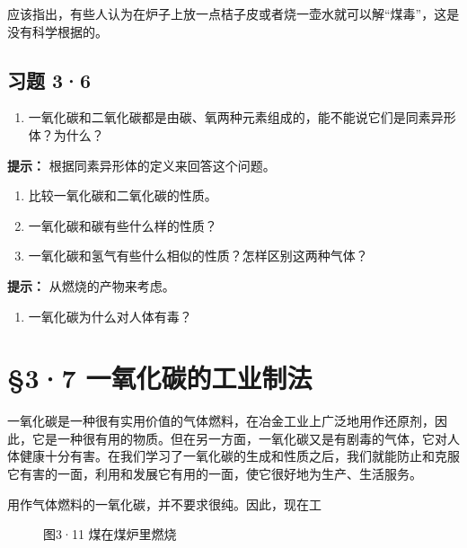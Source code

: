 应该指出，有些人认为在炉子上放一点桔子皮或者烧一壶水就可以解``煤毒''，这是没有科学根据的。

\subsection{习题 3·6}

\begin{enumerate}
\item
  一氧化碳和二氧化碳都是由碳、氧两种元素组成的，能不能说它们是同素异形体？为什么？
\end{enumerate}

\begin{shulihuadef}
\textbf{提示：} 根据同素异形体的定义来回答这个问题。
\end{shulihuadef}

\begin{enumerate}[start=2]
\item
  比较一氧化碳和二氧化碳的性质。
\item
  一氧化碳和碳有些什么样的性质？
\item
  一氧化碳和氢气有些什么相似的性质？怎样区别这两种气体？
\end{enumerate}

\begin{shulihuadef}
\textbf{提示：} 从燃烧的产物来考虑。
\end{shulihuadef}

\begin{enumerate}[start=5]
\item
  一氧化碳为什么对人体有毒？
\end{enumerate}

\section{§3·7 一氧化碳的工业制法}

一氧化碳是一种很有实用价值的气体燃料，在冶金工业上广泛地用作还原剂，因此，它是一种很有用的物质。但在另一方面，一氧化碳又是有剧毒的气体，它对人体健康十分有害。在我们学习了一氧化碳的生成和性质之后，我们就能防止和克服它有害的一面，利用和发展它有用的一面，使它很好地为生产、生活服务。

用作气体燃料的一氧化碳，并不要求很纯。因此，现在工

\begin{figure}
\centering
\caption{图3·11 煤在煤炉里燃烧}
\end{figure}

